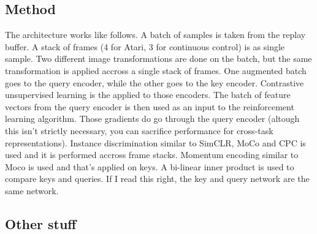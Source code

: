 \documentclass{article}
\begin{document}
\subsection{Method}
The architecture works like follows.
A batch of samples is taken from the replay buffer.
A stack of frames (4 for Atari, 3 for continuous control) is as single sample.
Two different image transformations are done on the batch,
but the same transformation is applied accross a single stack of frames.
One augmented batch goes to the query encoder, while the other goes to the key encoder.
Contrastive unsupervised learning is the applied to those encoders.
The batch of feature vectors from the query encoder is then used as an input to the 
reinforcement learning algorithm. Those gradients do go through the query encoder
(altough this isn't strictly necessary, you can sacrifice performance for 
cross-task representations).
Instance discrimination similar to SimCLR, MoCo and CPC is used
and it is performed accross frame stacks.
Momentum encoding similar to Moco is used and that's applied on 
keys.
A bi-linear inner product is used to compare keys and queries.
If I read this right, the key and query network are the same network.



\subsection{Other stuff}
\end{document}
